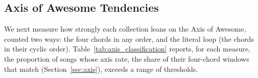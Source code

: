 \documentclass{article}
\newcommand{\rev}[1]{{\color{r2}#1}} %
\begin{document}




\subsection{Axis of Awesome Tendencies}
\label{sec:axis_tendencies}


\rev{We next measure how strongly each collection leans on the Axis of Awesome, counted two ways: the four chords in any order, and the literal loop (the chords in their cyclic order). Table~\ref{tab:axis_classification} reports, for each measure, the proportion of songs whose axis rate, the share of their four-chord windows that match (Section~\ref{sec:axis}), exceeds a range of thresholds.}
\end{document}
